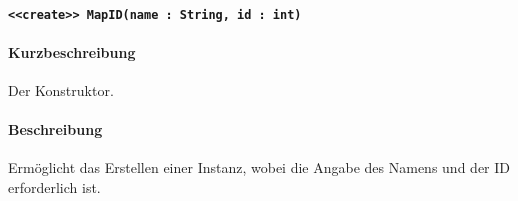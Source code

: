 \paragraph{\texttt{<<create>> MapID(name : String, id : int)}}%
\paragraph*{Kurzbeschreibung}
Der Konstruktor.
\paragraph*{Beschreibung}
Ermöglicht das Erstellen einer Instanz, wobei die Angabe des Namens und der ID erforderlich ist.

